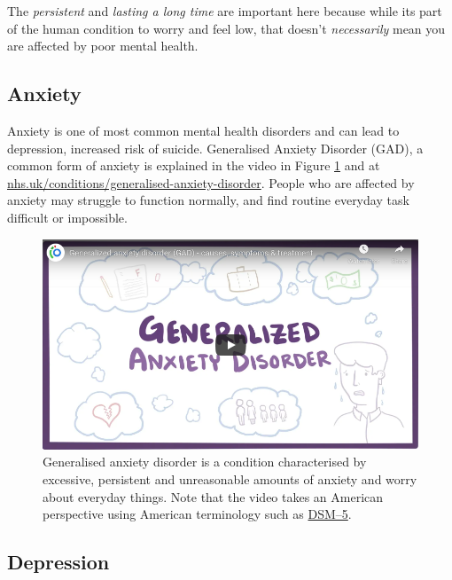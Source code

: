 \documentclass[
]{book}
\begin{document}
The \emph{persistent} and \emph{lasting a long time} are important here because while its part of the human condition to worry and feel low, that doesn't \emph{necessarily} mean you are affected by poor mental health.

\hypertarget{anxiety}{%
\subsection{Anxiety}\label{anxiety}}

Anxiety is one of most common mental health disorders and can lead to depression, increased risk of suicide. Generalised Anxiety Disorder (GAD), a common form of anxiety is explained in the video in Figure \ref{fig:anxious-fig} and at \href{https://www.nhs.uk/conditions/generalised-anxiety-disorder/}{nhs.uk/conditions/generalised-anxiety-disorder}. People who are affected by anxiety may struggle to function normally, and find routine everyday task difficult or impossible.

\begin{figure}

{\centering \includegraphics[width=0.99\linewidth]{images/youtube-anxiety} 

}

\caption{Generalised anxiety disorder is a condition characterised by excessive, persistent and unreasonable amounts of anxiety and worry about everyday things. \citep{youtube-anxiety} Note that the video takes an American perspective using American terminology such as \href{https://www.psychiatry.org/psychiatrists/practice/dsm}{DSM--5}.}\label{fig:anxious-fig}
\end{figure}



\hypertarget{depression}{%
\subsection{Depression}\label{depression}}
\end{document}
